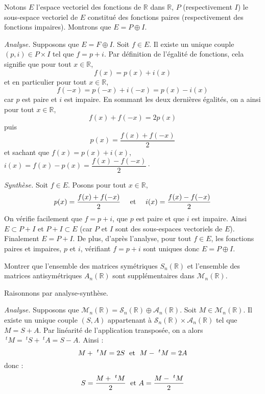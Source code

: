 \documentclass[a4paper,10pt]{report}
\begin{document}
\corr Notons $E$ l'espace vectoriel des fonctions de $\mathbb{R}$ dans $\mathbb{R}$, $P$ (respectivement $I$) le sous-espace vectoriel de $E$ constitué des fonctions paires (respectivement des fonctions impaires). Montrons que $E= P \oplus I$.

\medskip

\noindent \textit{Analyse.} Supposons que $E= F \oplus I$. Soit $f \in E$. Il existe un unique couple $(p,i) \in P \times I$ tel que $f=p + i$. Par définition de l'égalité de fonctions, cela signifie que pour tout $x \in \mathbb{R}$,
$$ f(x) = p(x)+i(x)$$
et en particulier pour tout $x \in \mathbb{R}$,
$$ f(-x) = p(-x)+i(-x) = p(x)-i(x)$$
car $p$ est paire et $i$ est impaire. En sommant les deux dernières égalités, on a ainsi pour tout $x \in \mathbb{R}$,
$$ f(x)+f(-x) = 2p(x) $$
puis
$$ p(x) = \frac{f(x)+f(-x)}{2}$$
et sachant que $f(x)=p(x)+i(x)$, $i(x)=f(x)-p(x) = \dfrac{f(x)-f(-x)}{2}\cdot$

\medskip

\noindent \textit{Synthèse.} Soit $f \in E$. Posons pour tout $x \in \mathbb{R}$,
$$ p(x) = \frac{f(x)+f(-x)}{2} \quad \hbox{ et } \quad i(x) = \frac{f(x)-f(-x)}{2} $$
On vérifie facilement que $f=p+i$, que $p$ est paire et que $i$ est impaire. Ainsi $E \subset P + I$ et $P + I \subset E$ (car $P$ et $I$ sont des sous-espaces vectoriels de $E$). Finalement $E=P+I$. De plus, d'après l'analyse, pour tout $f \in E$, les fonctions paires et impaires, $p$ et $i$, vérifiant $f=p+i$ sont uniques donc $E = P \oplus I$.

\medskip

\begin{Exercice}{} Montrer que l'ensemble des matrices symétriques $S_n(\mathbb{R})$ et l'ensemble des matrices antisymétriques $A_n(\mathbb{R})$ sont supplémentaires dans $\mathcal{M}_n(\mathbb{R})$.
\end{Exercice}

\corr Raisonnons par analyse-synthèse.

\medskip

\noindent \textit{Analyse.} Supposons que $\mathcal{M}_n(\mathbb{R})= \mathcal{S}_n(\mathbb{R}) \oplus \mathcal{A}_n(\mathbb{R})$. Soit $M \in \mathcal{M}_n(\mathbb{R})$. Il existe un unique couple $(S,A)$ appartenant à  $\mathcal{S}_n(\mathbb{R}) \times \mathcal{A}_n(\mathbb{R})$ tel que $M=S+A$. Par linéarité de l'application transposée, on a alors $~^t M = ~^t S + ~^t A = S-A$. Ainsi :
$$ M + ~^t M = 2S \; \hbox{ et } \; M- ~^tM= 2A$$
donc :
$$ S = \dfrac{M + ~^t M}{2} \; \hbox{ et } A = \dfrac{M-~^tM}{2}$$
\end{document}
